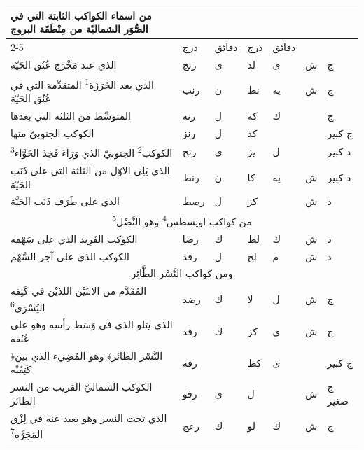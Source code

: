 \documentclass[11pt]{article}
\newcommand{\AbjadZero}{{\NallinoSigns\symbol{"E000}}}
\begin{document}
\begin{Arabic}\begin{tabular}{|p{84mm}|>{\centering\arraybackslash}p{9mm}|>{\centering\arraybackslash}p{9mm}|>{\centering\arraybackslash}p{9mm}|>{\centering\arraybackslash}p{9mm}|>{\centering\arraybackslash}p{14mm}|>{\centering\arraybackslash}p{17mm}|}\hline
\multirow{2}{*}{\parbox{80mm}{\centering من اسماء الكواكب الثابتة التي في الصُّوَر الشماليّة من مِنْطَقَة البروج}} & \multicolumn{2}{c|}{الطول} & \multicolumn{2}{c|}{العرض} & \multirow{2}{*}{\parbox{13mm}{\centering\small علامات الجهة}} & \multirow{2}{*}{\parbox{16mm}{\centering\small مراتب العظمة}} \\ \cline{2-5}
 & {\small درج} & {\small دقائق} & {\small درج} & {\small دقائق} & & \\ \hline
الذي عند مَخْرَج عُنُق الحَيّة & رنج & ى & لد & ى & ش & ج \\
الذي بعد الخَرَزَة\textsuperscript{1} المتقدِّمة التي في عُنُق الحَيّة & رنب & ن & نط & يه & ش & ج \\
المتوسِّط من الثلثة التي بعدها & رنه & ل & كه & ك &  & ج \\
الكوكب الجنوبيّ منها & رنز & ل & كد & \AbjadZero{} &  & ج كبير \\
الكوكب\textsuperscript{2} الجنوبيّ الذي وَرَاءَ فَخِذ الحَوَّاء\textsuperscript{3} & رنح & ى & يز & ل &  & د كبير \\
الذي يَلِي الاوّل من الثلثة التي على ذَنَب الحَيّة & رنط & ن & كا & يه & ش & د كبير \\
الذي على طَرَف ذَنَب الحَيَّة & رصط & ل & كز & \AbjadZero{} & ش & د \\
\hline
\multicolumn{7}{|c|}{\large من كواكب اويسطس\textsuperscript{4} وهو النَّصْل\textsuperscript{5}} \\ \hline
الكوكب الفَرِيد الذي على سَهْمه & رضا & ك & لط & ك & ش & د \\
الكوكب الذي على آخِر السَّهْم & رفد & ل & لح & م & ش & د \\
\hline
\multicolumn{7}{|c|}{\large ومن كواكب النَّسْر الطَّائِر} \\ \hline
المُقَدَّم من الاثنَيْن اللذيْن في كَتِفه اليُسْرَى\textsuperscript{6} & رضد & ك & لا & ل & ش & ج \\
الذي يتلو الذي في وَسَط رأسه وهو على عُنُقه & رفد & ك & كز & ى & ش & ج \\
﴿النَّسْر الطائر﴾ وهو المُضِيء الذي بين كَتِفَيْه & رفه & \AbjadZero{} & كط & ى &  & ج كبير \\
الكوكب الشماليّ القريب من النسر الطائر & رفو & ى & ل & \AbjadZero{} & ش & ج صغير \\
الذي تحت النسر وهو بعيد عنه في لِزْق المَجَرَّة\textsuperscript{7} & رعج & ك & لو & ك & ش & ج \\
\hline
\end{tabular}\end{Arabic}
\end{document}
